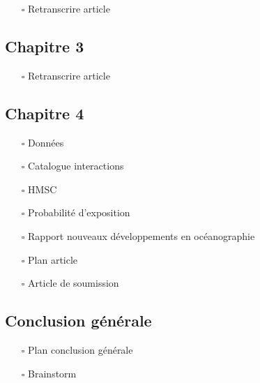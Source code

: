 \begin{itemize}
\tightlist
\item[$\square$]
  Retranscrire article
\end{itemize}

\hypertarget{chapitre-3}{%
\subsection{Chapitre 3}\label{chapitre-3}}

\begin{itemize}
\tightlist
\item[$\square$]
  Retranscrire article
\end{itemize}

\hypertarget{chapitre-4}{%
\subsection{Chapitre 4}\label{chapitre-4}}

\begin{itemize}
\tightlist
\item[$\square$]
  Données
\item[$\square$]
  Catalogue interactions
\item[$\square$]
  HMSC
\item[$\square$]
  Probabilité d'exposition
\item[$\square$]
  Rapport nouveaux développements en océanographie
\item[$\square$]
  Plan article
\item[$\square$]
  Article de soumission
\end{itemize}

\hypertarget{conclusion-guxe9nuxe9rale}{%
\subsection{Conclusion générale}\label{conclusion-guxe9nuxe9rale}}

\begin{itemize}
\tightlist
\item[$\square$]
  Plan conclusion générale
\item[$\square$]
  Brainstorm
\end{itemize}
